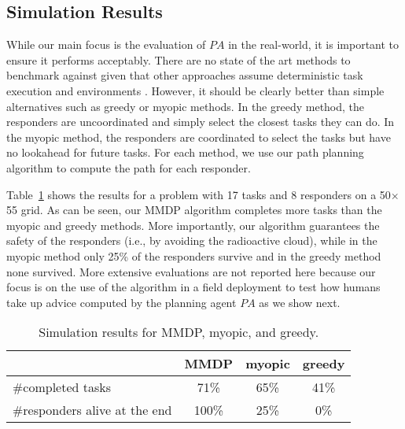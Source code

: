 \subsection{Simulation Results}
While our main focus  is the evaluation of $PA$ in the real-world, it is important  to ensure it
performs acceptably. There are no state of the art methods to benchmark against given that other approaches assume deterministic task execution and environments \cite{koes2006constraint,ramchurn:etal:2010b,Scerri2005,Chapman2009}. However, it should be clearly better than simple alternatives such as  greedy or myopic methods.  In
the greedy method, the responders are uncoordinated and simply select the
closest tasks they can do. In the myopic method, the responders are
coordinated to  select the tasks but have no lookahead for
future tasks. For each method, we use our
path planning algorithm to compute the path for each responder. 

Table~\ref{tab:simulation} shows the results for a problem with 17
tasks and 8 responders on a 50$\times$55 grid. As can be seen, our
MMDP algorithm completes more tasks than the myopic and greedy
methods. More importantly, our
algorithm guarantees the safety of the responders (i.e., by avoiding the radioactive cloud), while in the
myopic method  only 25\% of the responders survive and in the
greedy method none survived.
More extensive evaluations are not reported here because
our focus  is on the use of the algorithm in a field deployment
to test how humans take up advice computed by the planning agent
$PA$ as we show next.\vspace{-2mm}
\begin{table}[htbp]
\begin{center}\small
  
  \begin{tabular}{l|c|c|c}
   & MMDP & myopic & greedy \\
  \hline
  \#completed tasks & 71\% & 65\% & 41\% \\
  \hline
  \#responders alive at the end & 100\% & 25\% & 0\% \\
  \end{tabular}
  \end{center}\caption{Simulation results for MMDP, myopic, and greedy.}
  \label{tab:simulation}\vspace{-4mm}
\end{table}
